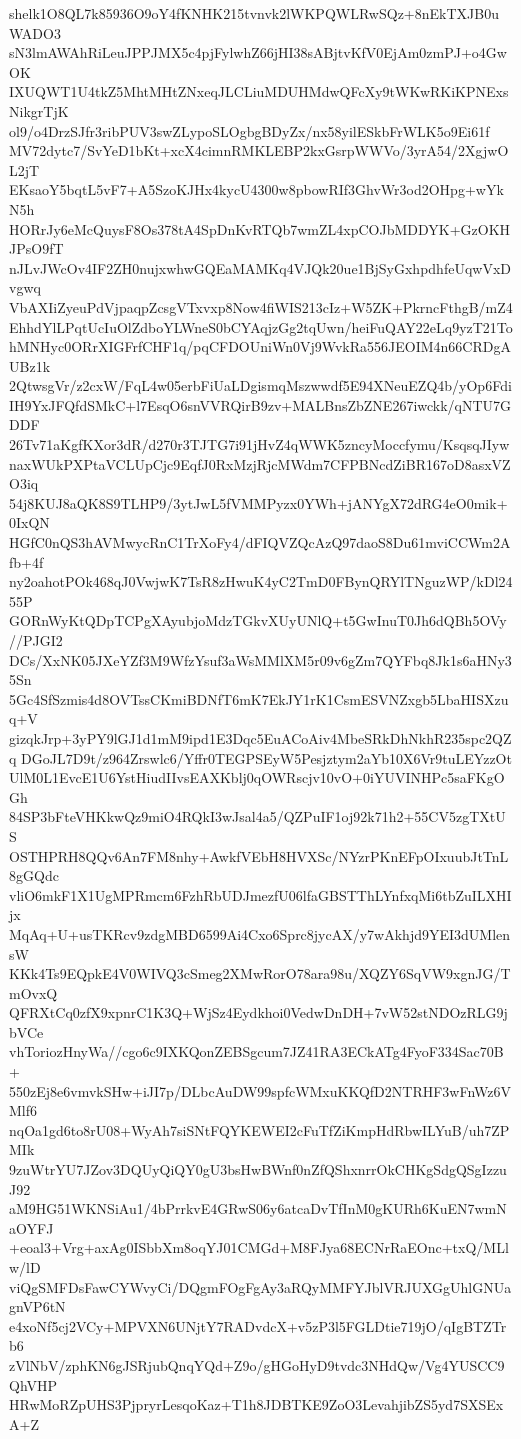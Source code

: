 shelk1O8QL7k85936O9oY4fKNHK215tvnvk2lWKPQWLRwSQz+8nEkTXJB0uWADO3
sN3lmAWAhRiLeuJPPJMX5c4pjFylwhZ66jHI38sABjtvKfV0EjAm0zmPJ+o4GwOK
IXUQWT1U4tkZ5MhtMHtZNxeqJLCLiuMDUHMdwQFcXy9tWKwRKiKPNExsNikgrTjK
ol9/o4DrzSJfr3ribPUV3swZLypoSLOgbgBDyZx/nx58yilESkbFrWLK5o9Ei61f
MV72dytc7/SvYeD1bKt+xcX4cimnRMKLEBP2kxGsrpWWVo/3yrA54/2XgjwOL2jT
EKsaoY5bqtL5vF7+A5SzoKJHx4kycU4300w8pbowRIf3GhvWr3od2OHpg+wYkN5h
HORrJy6eMcQuysF8Os378tA4SpDnKvRTQb7wmZL4xpCOJbMDDYK+GzOKHJPsO9fT
nJLvJWcOv4IF2ZH0nujxwhwGQEaMAMKq4VJQk20ue1BjSyGxhpdhfeUqwVxDvgwq
VbAXIiZyeuPdVjpaqpZcsgVTxvxp8Now4fiWIS213cIz+W5ZK+PkrncFthgB/mZ4
EhhdYlLPqtUcIuOlZdboYLWneS0bCYAqjzGg2tqUwn/heiFuQAY22eLq9yzT21To
hMNHyc0ORrXIGFrfCHF1q/pqCFDOUniWn0Vj9WvkRa556JEOIM4n66CRDgAUBz1k
2QtwsgVr/z2cxW/FqL4w05erbFiUaLDgismqMszwwdf5E94XNeuEZQ4b/yOp6Fdi
IH9YxJFQfdSMkC+l7EsqO6snVVRQirB9zv+MALBnsZbZNE267iwckk/qNTU7GDDF
26Tv71aKgfKXor3dR/d270r3TJTG7i91jHvZ4qWWK5zncyMoccfymu/KsqsqJIyw
naxWUkPXPtaVCLUpCjc9EqfJ0RxMzjRjcMWdm7CFPBNcdZiBR167oD8asxVZO3iq
54j8KUJ8aQK8S9TLHP9/3ytJwL5fVMMPyzx0YWh+jANYgX72dRG4eO0mik+0IxQN
HGfC0nQS3hAVMwycRnC1TrXoFy4/dFIQVZQcAzQ97daoS8Du61mviCCWm2Afb+4f
ny2oahotPOk468qJ0VwjwK7TsR8zHwuK4yC2TmD0FBynQRYlTNguzWP/kDl2455P
GORnWyKtQDpTCPgXAyubjoMdzTGkvXUyUNlQ+t5GwInuT0Jh6dQBh5OVy//PJGI2
DCs/XxNK05JXeYZf3M9WfzYsuf3aWsMMlXM5r09v6gZm7QYFbq8Jk1s6aHNy35Sn
5Gc4SfSzmis4d8OVTssCKmiBDNfT6mK7EkJY1rK1CsmESVNZxgb5LbaHISXzuq+V
gizqkJrp+3yPY9lGJ1d1mM9ipd1E3Dqc5EuACoAiv4MbeSRkDhNkhR235spc2QZq
DGoJL7D9t/z964Zrswlc6/Yffr0TEGPSEyW5Pesjztym2aYb10X6Vr9tuLEYzzOt
UlM0L1EvcE1U6YstHiudIIvsEAXKblj0qOWRscjv10vO+0iYUVINHPc5saFKgOGh
84SP3bFteVHKkwQz9miO4RQkI3wJsal4a5/QZPuIF1oj92k71h2+55CV5zgTXtUS
OSTHPRH8QQv6An7FM8nhy+AwkfVEbH8HVXSc/NYzrPKnEFpOIxuubJtTnL8gGQdc
vliO6mkF1X1UgMPRmcm6FzhRbUDJmezfU06lfaGBSTThLYnfxqMi6tbZuILXHIjx
MqAq+U+usTKRcv9zdgMBD6599Ai4Cxo6Sprc8jycAX/y7wAkhjd9YEI3dUMlensW
KKk4Ts9EQpkE4V0WIVQ3cSmeg2XMwRorO78ara98u/XQZY6SqVW9xgnJG/TmOvxQ
QFRXtCq0zfX9xpnrC1K3Q+WjSz4Eydkhoi0VedwDnDH+7vW52stNDOzRLG9jbVCe
vhToriozHnyWa//cgo6c9IXKQonZEBSgcum7JZ41RA3ECkATg4FyoF334Sac70B+
550zEj8e6vmvkSHw+iJI7p/DLbcAuDW99spfcWMxuKKQfD2NTRHF3wFnWz6VMlf6
nqOa1gd6to8rU08+WyAh7siSNtFQYKEWEI2cFuTfZiKmpHdRbwILYuB/uh7ZPMIk
9zuWtrYU7JZov3DQUyQiQY0gU3bsHwBWnf0nZfQShxnrrOkCHKgSdgQSgIzzuJ92
aM9HG51WKNSiAu1/4bPrrkvE4GRwS06y6atcaDvTfInM0gKURh6KuEN7wmNaOYFJ
+eoal3+Vrg+axAg0ISbbXm8oqYJ01CMGd+M8FJya68ECNrRaEOnc+txQ/MLlw/lD
viQgSMFDsFawCYWvyCi/DQgmFOgFgAy3aRQyMMFYJblVRJUXGgUhlGNUagnVP6tN
e4xoNf5cj2VCy+MPVXN6UNjtY7RADvdcX+v5zP3l5FGLDtie719jO/qIgBTZTrb6
zVlNbV/zphKN6gJSRjubQnqYQd+Z9o/gHGoHyD9tvdc3NHdQw/Vg4YUSCC9QhVHP
HRwMoRZpUHS3PjpryrLesqoKaz+T1h8JDBTKE9ZoO3LevahjibZS5yd7SXSExA+Z
